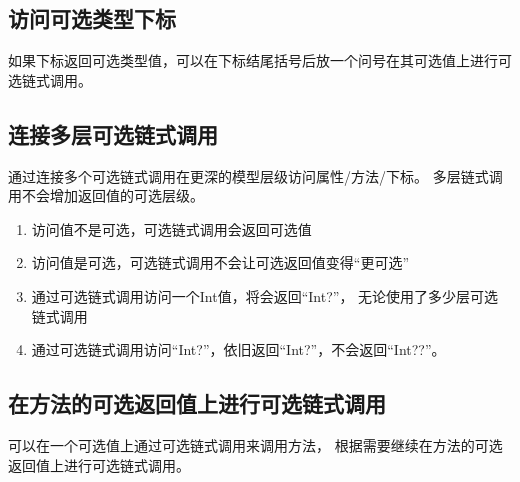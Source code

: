 \documentclass{../main.tex}{subfiles}
\begin{document}
\subsection{访问可选类型下标}
如果下标返回可选类型值，可以在下标结尾括号后放一个问号在其可选值上进行可选链式调用。

\subsection{连接多层可选链式调用}
通过连接多个可选链式调用在更深的模型层级访问属性/方法/下标。
多层链式调用不会增加返回值的可选层级。
\begin{enumerate}[itemsep=0pt, parsep=0pt, topsep=0pt, partopsep=0pt]
    \item 访问值不是可选，可选链式调用会返回可选值
    \item 访问值是可选，可选链式调用不会让可选返回值变得``更可选''
    \item 通过可选链式调用访问一个Int值，将会返回``Int?''，
            无论使用了多少层可选链式调用
    \item 通过可选链式调用访问``Int?''，依旧返回``Int?''，不会返回``Int??''。
\end{enumerate}

\subsection{在方法的可选返回值上进行可选链式调用}
可以在一个可选值上通过可选链式调用来调用方法，
    根据需要继续在方法的可选返回值上进行可选链式调用。


\end{document}
